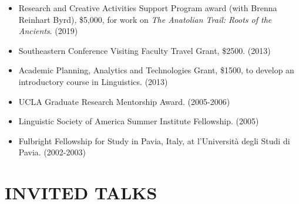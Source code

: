 \documentclass[paper=letter,fontsize=11pt,enabledeprecatedfontcommands]{scrartcl} %
\newcommand{\NewPart}[2]{\section*{\uppercase{#1} #2}}
\begin{document}
\begin{itemize}
\item Research and Creative Activities Support Program award (with Brenna Reinhart Byrd), \$5,000, for work on {\it The Anatolian Trail: Roots of the Ancients}. (2019)
\item Southeastern Conference Visiting Faculty Travel Grant, \$2500. (2013)
\item Academic Planning, Analytics and Technologies Grant, \$1500, to develop an introductory course in Linguistics. (2013)
\item UCLA Graduate Research Mentorship Award. (2005-2006)
\item Linguistic Society of America Summer Institute Fellowship. (2005)
\item Fulbright Fellowship for Study in Pavia, Italy, at l'Università degli Studi di Pavia. (2002-2003)
\end{itemize}

 
\NewPart{Invited Talks}{}
\end{document}
